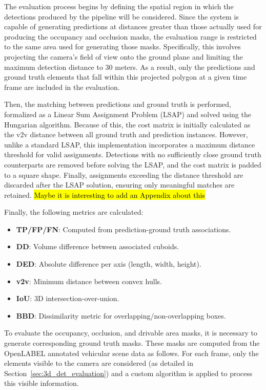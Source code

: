 The evaluation process begins by defining the spatial region in which the detections produced by the pipeline will be considered. Since the system is capable of generating predictions at distances greater than those actually used for producing the  occupancy and occlusion masks, the evaluation range is restricted to the same area used for generating those masks. Specifically, this involves projecting the camera's field of view onto the ground plane and limiting the maximum detection distance to $30$ meters. As a result, only the predictions and ground truth elements that fall within this projected polygon at a given time frame are included in the evaluation.

Then, the matching between predictions and ground truth is performed, formalized as a Linear Sum Assignment Problem (LSAP) and solved using the Hungarian algorithm. Because of this, the cost matrix is initially calculated as the v2v distance between all ground truth and prediction instances.  However, unlike a standard LSAP, this implementation incorporates a maximum distance threshold for valid assignments. Detections with no sufficiently close ground truth counterparts are removed before solving the LSAP, and the cost matrix is padded to a square shape. Finally, assignments exceeding the distance threshold are discarded after the LSAP solution, ensuring only meaningful matches are retained. 
\hl{Maybe it is interesting to add an Appendix about this}

Finally, the following metrics are calculated:
\begin{itemize}
    \item \textbf{TP/FP/FN}: Computed from prediction-ground truth associations.
    \item \textbf{DD}: Volume difference between associated cuboids. %
    \item \textbf{DED}: Absolute difference per axis (length, width, height). %
    \item \textbf{v2v}: Minimum distance between convex hulls. %
    \item \textbf{IoU}: 3D intersection-over-union. %
    \item \textbf{BBD}: Dissimilarity metric for overlapping/non-overlapping boxes. %
\end{itemize}


To evaluate the occupancy, occlusion, and drivable area masks, it is necessary to generate corresponding ground truth masks. These masks are computed from the OpenLABEL annotated vehicular scene data as follows. For each frame, only the elements visible to the camera are considered (as detailed in Section~\ref{sec:3d_det_evaluation}) and a custom algorithm is applied to process this visible information.


